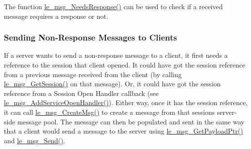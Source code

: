 The function \hyperlink{le__messaging_8h_a8b0824781c030b9ed6f8be48e4d20419}{le\+\_\+msg\+\_\+\+Needs\+Response()} can be used to check if a received message requires a response or not.\hypertarget{c_messaging_c_messagingServerSendingNonResponse}{}\subsubsection{Sending Non-\/\+Response Messages to Clients}\label{c_messaging_c_messagingServerSendingNonResponse}
If a server wants to send a non-\/response message to a client, it first needs a reference to the session that client opened. It could have got the session reference from a previous message received from the client (by calling \hyperlink{le__messaging_8h_a253088f1b852575b60d7732ca7afc79b}{le\+\_\+msg\+\_\+\+Get\+Session()} on that message). Or, it could have got the session reference from a Session Open Handler callback (see \hyperlink{le__messaging_8h_a829d6450d487166e0b2994b4bf44ee5d}{le\+\_\+msg\+\_\+\+Add\+Service\+Open\+Handler()}). Either way, once it has the session reference, it can call \hyperlink{le__messaging_8h_a8293a69f256b98cbce5b9990ea3520f3}{le\+\_\+msg\+\_\+\+Create\+Msg()} to create a message from that session\textquotesingle{}s server-\/side message pool. The message can then be populated and sent in the same way that a client would send a message to the server using \hyperlink{le__messaging_8h_a32d1c7ffd913db8546f6f1bd5cce58c4}{le\+\_\+msg\+\_\+\+Get\+Payload\+Ptr()} and \hyperlink{le__messaging_8h_a073de097d281475c44a445b927fbb929}{le\+\_\+msg\+\_\+\+Send()}.


